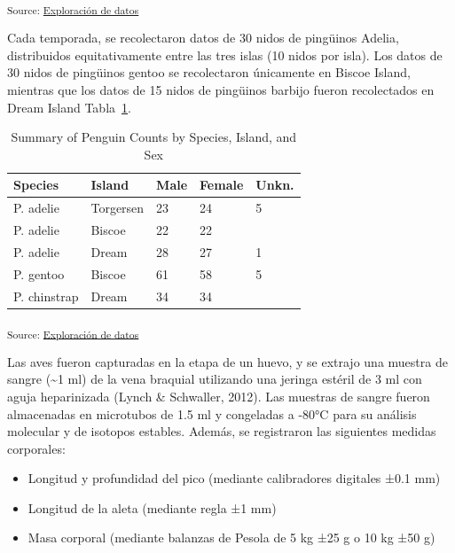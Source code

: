 \documentclass[
]{agujournal2019}
\providecommand{\tightlist}{%
  \setlength{\itemsep}{0pt}\setlength{\parskip}{0pt}}\usepackage{longtable,booktabs,array}
\begin{document}
\textsubscript{Source:
\href{https://sofiazorrilla.github.io/articulo_ping-inos/notebooks/ExploracionDatos-preview.html\#cell-fig-mapa-distribucion}{Exploración
de datos}}

Cada temporada, se recolectaron datos de 30 nidos de pingüinos Adelia,
distribuidos equitativamente entre las tres islas (10 nidos por isla).
Los datos de 30 nidos de pingüinos gentoo se recolectaron únicamente en
Biscoe Island, mientras que los datos de 15 nidos de pingüinos barbijo
fueron recolectados en Dream Island Tabla~\ref{tbl-sampling}.

\begin{longtable}[]{@{}lllll@{}}

\caption{\label{tbl-sampling}Summary of Penguin Counts by Species,
Island, and Sex}

\tabularnewline

\toprule\noalign{}
Species & Island & Male & Female & Unkn. \\
\midrule\noalign{}
\endhead
\bottomrule\noalign{}
\endlastfoot
P. adelie & Torgersen & 23 & 24 & 5 \\
P. adelie & Biscoe & 22 & 22 & \\
P. adelie & Dream & 28 & 27 & 1 \\
P. gentoo & Biscoe & 61 & 58 & 5 \\
P. chinstrap & Dream & 34 & 34 & \\

\end{longtable}

\textsubscript{Source:
\href{https://sofiazorrilla.github.io/articulo_ping-inos/notebooks/ExploracionDatos-preview.html\#cell-tbl-sampling}{Exploración
de datos}}

Las aves fueron capturadas en la etapa de un huevo, y se extrajo una
muestra de sangre (\textasciitilde1 ml) de la vena braquial utilizando
una jeringa estéril de 3 ml con aguja heparinizada (Lynch \& Schwaller,
2012). Las muestras de sangre fueron almacenadas en microtubos de 1.5 ml
y congeladas a -80°C para su análisis molecular y de isotopos estables.
Además, se registraron las siguientes medidas corporales:

\begin{itemize}
\tightlist
\item
  Longitud y profundidad del pico (mediante calibradores digitales ±0.1
  mm)\\
\item
  Longitud de la aleta (mediante regla ±1 mm)\\
\item
  Masa corporal (mediante balanzas de Pesola de 5 kg ±25 g o 10 kg ±50
  g)
\end{itemize}
\end{document}
